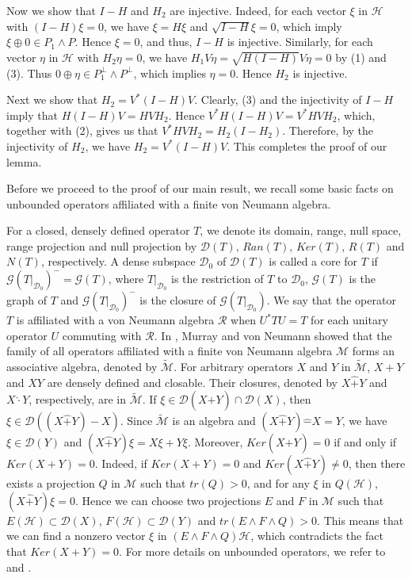 \documentclass[12pt]{article}
\newcommand{\DDD}{\mathcal D}
\newcommand{\HHH}{\mathcal H} %
\newcommand{\MMM}{\mathcal M}
\begin{document}
{Now we show that $I-H$ and $H_2$ are injective. Indeed, for each
vector $\xi$ in $\HHH$ with $(I-H)\xi=0$, we have $\xi=H\xi$ and
$\sqrt{I-H}\xi=0$, which imply $\xi\oplus 0\in P_1\wedge P$. Hence
$\xi=0$, and thus, $I-H$ is injective. Similarly, for each vector
$\eta$ in $\HHH$ with $H_2\eta=0$, we have $H_{1}V\eta =
\sqrt{H(I-H)}V\eta=0$ by (1) and (3). Thus $0\oplus \eta \in
P_1^{\perp}\wedge P^{\perp}$, which implies $\eta=0$. Hence $H_2$ is
injective.


Next we show that $H_2=V^*(I-H)V$. Clearly, (3) and the injectivity
of $I-H$ imply that $H(I-H)V=HVH_2$. Hence $V^*H(I-H)V=V^*HVH_2$,
which, together with (2), gives us that $V^*HVH_2=H_2(I-H_2)$.
Therefore, by the injectivity of $H_2$, we have $H_2=V^*(I-H)V$.
This completes the proof of our lemma.


\vspace{2mm} Before we proceed to the proof of our main result, we
recall some basic facts on unbounded operators affiliated with a
finite von Neumann algebra.

For a closed, densely defined operator $T$, we denote its  domain,
range, null space, range projection and null projection by
$\DDD(T),\, Ran(T),\, Ker(T)$, $R(T)$ and $N(T)$, respectively. A
dense subspace $\DDD_{0}$ of $\DDD(T)$ is called a core for $T$ if
$\mathcal{G}(T|_{ \DDD_{0}})^{-} = \mathcal{G}(T)$, where $T|_{
\DDD_{0}}$ is the restriction of $T$ to $\DDD_{0}$, $\mathcal{G}(T)$
is the graph of $T$ and $\mathcal{G}(T|_{ \DDD_{0}})^{-}$ is the
closure of $\mathcal{G}(T|_{ \DDD_{0}})$. We say that the operator
$T$ is affiliated with a von Neumann algebra $\mathcal{R}$ when
$U^{*}TU = T$  for each unitary operator $U$ commuting with
$\mathcal{R}$. In \cite{MV}, Murray and von Neumann showed that the
family of all operators affiliated with a finite von Neumann algebra
$\MMM$ forms an associative algebra, denoted by $\widetilde{\MMM}$.
For arbitrary operators $X$ and $Y$ in $\widetilde{\MMM}$, $X +Y$
and $XY$ are densely defined and closable. Their closures, denoted
by $X \widehat{+} Y$ and $X\widehat{\cdot} Y$, respectively, are in
$\widetilde{\MMM}$. If $\xi \in \DDD(X \widehat{+} Y) \cap \DDD(X)$,
then $\xi \in \DDD((X \widehat{+} Y) - X)$. Since $\widetilde{\MMM}$
is an algebra and $(X \widehat{+} Y) \widehat{-} X = Y$, we have
$\xi \in \DDD(Y)$ and $(X \widehat{+} Y)\xi = X\xi + Y\xi$.
Moreover, $Ker(X \widehat{+} Y) = 0$ if and only if $Ker(X +Y) = 0$.
Indeed, if $Ker(X +Y) = 0$ and $Ker(X \widehat{+} Y) \neq 0 $, then
there exists a projection $Q$ in $\MMM$ such that $tr(Q)> 0$, and
for any $\xi$ in $Q(\HHH)$, $(X \widehat{+} Y)\xi = 0$. Hence we can
choose two projections $E$ and $F$ in $\MMM$ such that $E(\HHH)
\subset \DDD(X)$, $F(\HHH) \subset \DDD(Y)$ and $tr(E \wedge F
\wedge Q) > 0$. This means that we can find a nonzero vector $\xi$
in $(E \wedge F \wedge Q) \HHH$, which contradicts the fact that
$Ker(X +Y) = 0$. For more details on unbounded operators, we refer
to \cite[Exercises 6.9.54 and 8.7.60]{KR1} and \cite{MV}.


}
\end{document}
